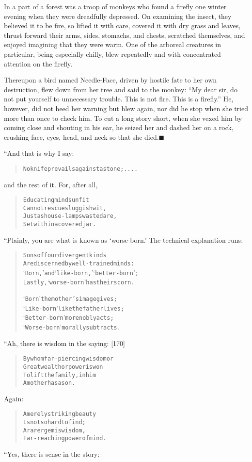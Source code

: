 \documentclass[article, twoside, 14pt]{memoir}
\newcommand{\qed}{\hfill \ensuremath{\blacksquare}}
\renewenvironment{verbatim}{%
\begin{quote}%
\vskip -10pt%
\begin{alltt}\normalfont\large}{\end{alltt}%
\end{quote}%
\vskip -10pt
} %
\begin{document}
\label{s28}

In a part of a forest was a troop of monkeys who found a firefly
one winter evening when they were dreadfully depressed. On
examining the insect, they believed it to be fire, so lifted it
with care, covered it with dry grass and leaves, thrust forward
their arms, sides, stomachs, and chests, scratched themselves, and
enjoyed imagining that they were warm. One of the arboreal
creatures in particular, being especially chilly, blew repeatedly
and with concentrated attention on the firefly.

Thereupon a bird named Needle-Face, driven by hostile fate to her
own destruction, flew down from her tree and said to the monkey:
``My dear sir, do not put yourself to unnecessary trouble. This is not fire. This is a firefly.''
He, however, did not heed her warning but blew again, nor did he
stop when she tried more than once to check him. To cut a long
story short, when she vexed him by coming close and shouting in his
ear, he seized her and dashed her on a rock, crushing face, eyes,
head, and neck so that she died.\hyperref[s28]{\qed}

“And that is why I say:

\begin{verbatim}
No knife prevails against a stone; ....
\end{verbatim}
and the rest of it. For, after all,

\begin{verbatim}
Educating minds unfit
Cannot rescue sluggish wit,
Just as house-lamps wasted are,
Set within a covered jar.
\end{verbatim}
“Plainly, you are what is known as `worse-born.' The technical
explanation runs:

\begin{verbatim}
Sons of four divergent kinds
Are discerned by well-trained minds:
‘Born,’ and ‘like-born,’ ‘better-born’;
Lastly, ‘worse-born’ has their scorn.

‘Born’ the mother's image gives;
‘Like-born’ like the father lives;
‘Better-born’ more nobly acts;
‘Worse-born’ morally subtracts.
\end{verbatim}
“Ah, there is wisdom in the saying: [170]

\begin{verbatim}
By whom far-piercing wisdom or
    Great wealth or power is won
To lift the family, in him
    A mother has a son.
\end{verbatim}
Again:

\begin{verbatim}
A merely striking beauty
    Is not so hard to find;
A rarer gem is wisdom,
    Far-reaching power of mind.
\end{verbatim}
“Yes, there is sense in the story:
\end{document}

